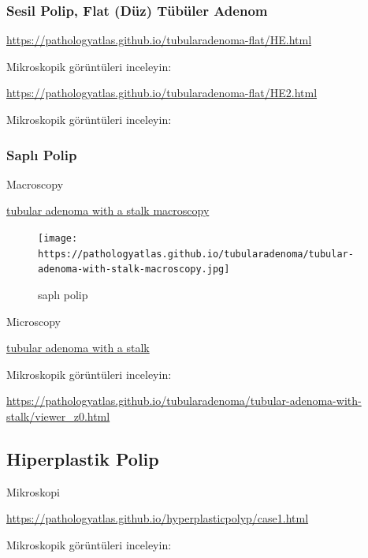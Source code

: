 \documentclass[
  letterpaper,
  DIV=11,
  numbers=noendperiod]{scrreprt}
\begin{document}
\hypertarget{sesil-polip-flat-duxfcz-tuxfcbuxfcler-adenom-1}{%
\subsubsection{Sesil Polip, Flat (Düz) Tübüler
Adenom}\label{sesil-polip-flat-duxfcz-tuxfcbuxfcler-adenom-1}}

\url{https://pathologyatlas.github.io/tubularadenoma-flat/HE.html}

Mikroskopik görüntüleri inceleyin:

\url{https://pathologyatlas.github.io/tubularadenoma-flat/HE2.html}

Mikroskopik görüntüleri inceleyin:

\hypertarget{saplux131-polip-1}{%
\subsubsection{Saplı Polip}\label{saplux131-polip-1}}

Macroscopy

\href{https://pathologyatlas.github.io/tubularadenoma/tubular-adenoma-with-stalk-macroscopy.jpg}{tubular
adenoma with a stalk macroscopy}

\begin{figure}

{\centering \texttt{[image: https://pathologyatlas.github.io/tubularadenoma/tubular-adenoma-with-stalk-macroscopy.jpg]}

}

\caption{saplı polip}

\end{figure}

Microscopy

\href{https://pathologyatlas.github.io/tubularadenoma/tubular-adenoma-with-stalk.jpeg}{tubular
adenoma with a stalk}

Mikroskopik görüntüleri inceleyin:

\url{https://pathologyatlas.github.io/tubularadenoma/tubular-adenoma-with-stalk/viewer_z0.html}

\hypertarget{hiperplastik-polip}{%
\subsection{Hiperplastik Polip}\label{hiperplastik-polip}}

Mikroskopi

\url{https://pathologyatlas.github.io/hyperplasticpolyp/case1.html}

Mikroskopik görüntüleri inceleyin:
\end{document}

